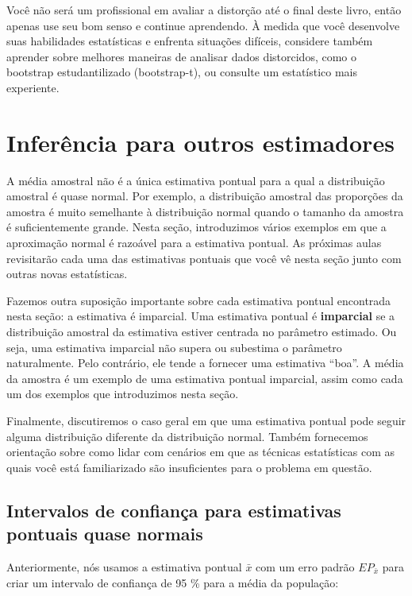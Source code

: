\documentclass[
]{book}
\theoremstyle{definition}
\theoremstyle{definition}
\theoremstyle{definition}
\theoremstyle{definition}
\theoremstyle{remark}
\begin{document}
Você não será um profissional em avaliar a distorção até o final deste livro, então apenas use seu bom senso e continue aprendendo. À medida que você desenvolve suas habilidades estatísticas e enfrenta situações difíceis, considere também aprender sobre melhores maneiras de analisar dados distorcidos, como o bootstrap estudantilizado (bootstrap-t), ou consulte um estatístico mais experiente.

\hypertarget{inferenceOtherEstimators}{%
\section{Inferência para outros estimadores}\label{inferenceOtherEstimators}}

A média amostral não é a única estimativa pontual para a qual a distribuição amostral é quase normal. Por exemplo, a distribuição amostral das proporções da amostra é muito semelhante à distribuição normal quando o tamanho da amostra é suficientemente grande. Nesta seção, introduzimos vários exemplos em que a aproximação normal é razoável para a estimativa pontual. As próximas aulas revisitarão cada uma das estimativas pontuais que você vê nesta seção junto com outras novas estatísticas.

Fazemos outra suposição importante sobre cada estimativa pontual encontrada nesta seção: a estimativa é imparcial. Uma estimativa pontual é \textbf{imparcial} se a distribuição amostral da estimativa estiver centrada no parâmetro estimado. Ou seja, uma estimativa imparcial não supera ou subestima o parâmetro naturalmente. Pelo contrário, ele tende a fornecer uma estimativa ``boa''. A média da amostra é um exemplo de uma estimativa pontual imparcial, assim como cada um dos exemplos que introduzimos nesta seção.

Finalmente, discutiremos o caso geral em que uma estimativa pontual pode seguir alguma distribuição diferente da distribuição normal. Também fornecemos orientação sobre como lidar com cenários em que as técnicas estatísticas com as quais você está familiarizado são insuficientes para o problema em questão.

\hypertarget{CIPointEstimatesAlmostNormal}{%
\subsection{Intervalos de confiança para estimativas pontuais quase normais}\label{CIPointEstimatesAlmostNormal}}

Anteriormente, nós usamos a estimativa pontual \(\bar{x}\) com um erro padrão \(EP_{\bar{x}}\) para criar um intervalo de confiança de 95 \% para a média da população:
\end{document}
